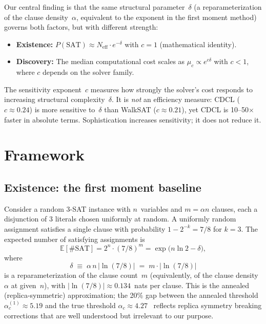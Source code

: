 \documentclass[11pt,a4paper]{article}
\newcommand{\mc}{\mu_c}
\newcommand{\Neff}{N_{\text{eff}}}
\newcommand{\PSAT}{P(\text{SAT})}
\begin{document}
Our central finding is that the same structural parameter~$\delta$
(a reparameterization of the clause density~$\alpha$,
equivalent to the exponent in the first moment method)
governs both factors, but with different strength:
\begin{itemize}
\item \textbf{Existence:} $\PSAT \approx \Neff \cdot e^{-\delta}$
      with $c = 1$ (mathematical identity).
\item \textbf{Discovery:} The median computational cost scales as
      $\mc \propto e^{c\delta}$ with $c < 1$, where $c$ depends
      on the solver family.
\end{itemize}
The sensitivity exponent~$c$ measures how strongly the solver's
cost responds to increasing structural complexity~$\delta$.
It is \emph{not} an efficiency measure:
CDCL ($c \approx 0.24$) is more sensitive to~$\delta$ than
WalkSAT ($c \approx 0.21$), yet CDCL is 10--50$\times$ faster
in absolute terms.
Sophistication increases sensitivity; it does not reduce it.


\section{Framework}
\label{sec:framework}

\subsection{Existence: the first moment baseline}

Consider a random 3-SAT instance with $n$~variables and
$m = \alpha n$ clauses, each a disjunction of 3 literals
chosen uniformly at random.
A uniformly random assignment satisfies a single clause with
probability $1 - 2^{-k} = 7/8$ for $k=3$.
The expected number of satisfying assignments is
\begin{equation}
\label{eq:first-moment}
\mathbb{E}[\#\text{SAT}] = 2^n \cdot (7/8)^m
  = \exp\!\bigl(n\ln 2 - \delta\bigr),
\end{equation}
where
\begin{equation}
\label{eq:delta}
\delta \;\equiv\; \alpha\, n\, |\!\ln(7/8)|
  \;=\; m \cdot |\!\ln(7/8)|
\end{equation}
is a reparameterization of the clause count~$m$
(equivalently, of the clause density~$\alpha$ at given~$n$),
with $|\!\ln(7/8)| \approx 0.134$~nats per clause.
This is the annealed (replica-symmetric) approximation;
the 20\% gap between the annealed threshold
$\alpha_c^{(1)} \approx 5.19$ and the true threshold
$\alpha_c \approx 4.27$~\cite{MPZ2009} reflects replica symmetry
breaking corrections that are well understood but irrelevant
to our purpose.
\end{document}
